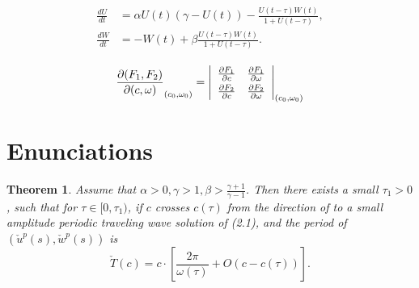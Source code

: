 \documentclass{cta-author}%
\newtheorem{theorem}{Theorem}{}
\begin{document}
\begin{align}\label{1.2}
\begin{split}
\frac{dU}{dt} &=\alpha U(t)(\gamma -U(t))-\frac{U(t-\tau)W(t)}{1+U(t-\tau)},\\
\frac{dW}{dt} &=-W(t)+\beta\frac{U(t-\tau)W(t)}{1+U(t-\tau)}.
\end{split}
\end{align}

\[
\frac{\partial(F_1,F_2)}{\partial(c,\omega)}_{(c_0,\omega_0)} = \left|
\begin{array}{ll}
\frac{\partial F_1}{\partial c} &\frac{\partial F_1}{\partial \omega} \\\noalign{\vskip3pt}
\frac{\partial F_2}{\partial c}&\frac{\partial F_2}{\partial \omega}
\end{array}\right|_{(c_0,\omega_0)}
\]

\section{Enunciations}





\begin{theorem}\label{T0.1}
Assume that $\alpha>0, \gamma>1, \beta>\frac{\gamma+1}{\gamma-1}$.
Then there exists a small $\tau_1>0$, such that for $\tau\in
[0,\tau_1)$, if $c$ crosses $c(\tau)$ from the direction of
to  a small amplitude periodic traveling wave solution of
(2.1), and the period of $(\check{u}^p(s),\check{w}^p(s))$ is
\[
\check{T}(c)=c\cdot \left[\frac{2\pi}{\omega(\tau)}+O(c-c(\tau))\right].
\]
\end{theorem}
\end{document}
